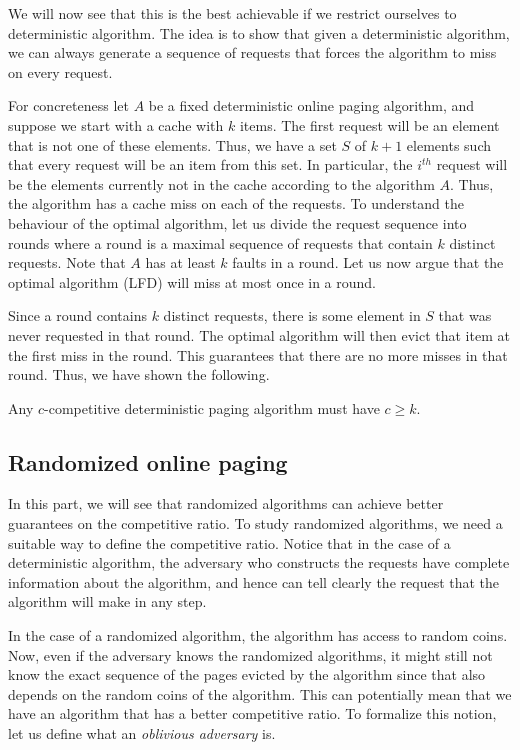 We will now see that this is the best achievable if we restrict ourselves to deterministic algorithm. The idea is to show that given a deterministic algorithm, we can always generate a sequence of requests that forces the algorithm to miss on every request. 

For concreteness let $A$ be a fixed deterministic online paging algorithm, and suppose we start with a cache with $k$ items. The first request will be an element that is not one of these elements. Thus, we have a set $S$ of $k+1$ elements such that every request will be an item from this set. In particular, the $i^{th}$ request will be the elements currently not in the cache according to the algorithm $A$. Thus, the algorithm has a cache miss on each of the requests. To understand the behaviour of the optimal algorithm, let us divide the request sequence into rounds where a round is a maximal sequence of requests that contain $k$ distinct requests. Note that $A$ has at least $k$ faults in a round. Let us now argue that the optimal algorithm (LFD) will miss at most once in a round. 

Since a round contains $k$ distinct requests, there is some element in $S$ that was never requested in that round. The optimal algorithm will then evict that item at the first miss in the round. This guarantees that there are no more misses in that round. Thus, we have shown the following.

\begin{theorem}
	Any $c$-competitive deterministic paging algorithm must have $c \geq k$.
	\label{thm:paging-det-lb}
\end{theorem}

\subsection{Randomized online paging}

In this part, we will see that randomized algorithms can achieve better guarantees on the competitive ratio. To study randomized algorithms, we need a suitable way to define the competitive ratio. Notice that in the case of a deterministic algorithm, the adversary who constructs the requests have complete information about the algorithm, and hence can tell clearly the request that the algorithm will make in any step.

In the case of a randomized algorithm, the algorithm has access to random coins. Now, even if the adversary knows the randomized algorithms, it might still not know the exact sequence of the pages evicted by the algorithm since that also depends on the random coins of the algorithm. This can potentially mean that we have an algorithm that has a better competitive ratio. To formalize this notion, let us define what an \emph{oblivious adversary} is.

